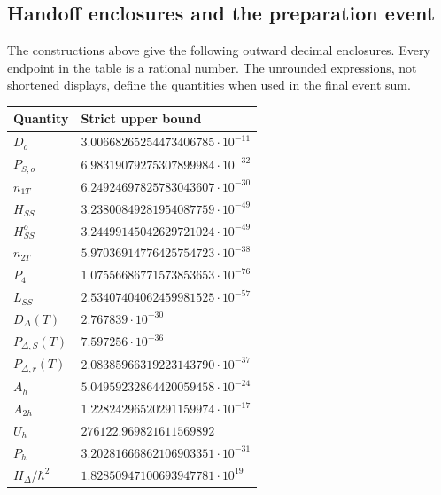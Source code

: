 \documentclass[11pt]{article}
\theoremstyle{definition}\newtheorem{definition}[theorem]{Definition}
\theoremstyle{remark}\newtheorem{remark}[theorem]{Remark}
\begin{document}
\subsection{Handoff enclosures and the preparation event}
\label{prep:handoff-table}
The constructions above give the following outward decimal enclosures.
Every endpoint in the table is a rational number. The unrounded
expressions, not shortened displays, define the quantities when used
in the final event sum.
\begin{center}\small
\begin{tabular}{ll}
\toprule
Quantity&Strict upper bound\\\midrule
$D_o$&$3.00668265254473406785\cdot10^{-11}$\\
$P_{S,o}$&$6.98319079275307899984\cdot10^{-32}$\\
$n_{1T}$&$6.24924697825783043607\cdot10^{-30}$\\
$H_{SS}$&$3.23800849281954087759\cdot10^{-49}$\\
$H_{SS}^{o}$&$3.24499145042629721024\cdot10^{-49}$\\
$n_{2T}$&$5.97036914776425754723\cdot10^{-38}$\\
$P_4$&$1.07556686771573853653\cdot10^{-76}$\\
$L_{SS}$&$2.53407404062459981525\cdot10^{-57}$\\
$D_\Delta(T)$&$2.767839\cdot10^{-30}$\\
$P_{\Delta,S}(T)$&$7.597256\cdot10^{-36}$\\
$P_{\Delta,r}(T)$&$2.08385966319223143790\cdot10^{-37}$\\
$A_h$&$5.04959232864420059458\cdot10^{-24}$\\
$A_{2h}$&$1.22824296520291159974\cdot10^{-17}$\\
$U_h$&$276122.969821611569892$\\
$P_h$&$3.20281666862106903351\cdot10^{-31}$\\
$H_\Delta/\hbar^2$&$1.82850947100693947781\cdot10^{19}$\\
\bottomrule
\end{tabular}
\end{center}
\end{document}

